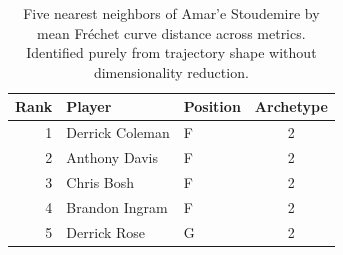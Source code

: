 \begin{table}[htbp]
  \centering\small
  \begin{tabular}{rllc}
    \toprule
    Rank & Player & Position & Archetype \\
    \midrule
    1 & Derrick Coleman & F & 2 \\
    2 & Anthony Davis & F & 2 \\
    3 & Chris Bosh & F & 2 \\
    4 & Brandon Ingram & F & 2 \\
    5 & Derrick Rose & G & 2 \\
    \bottomrule
  \end{tabular}
  \caption{Five nearest neighbors of Amar'e Stoudemire by mean Fr\'{e}chet curve distance across metrics. Identified purely from trajectory shape without dimensionality reduction.}
  \label{tab:Amar_e_Stoudemire_frechet_curve_neighbors}
\end{table}

